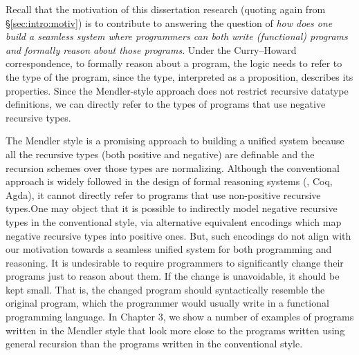 Recall that the motivation of this dissertation research
(quoting again from \S\ref{sec:intro:motiv})
is to contribute to answering the question of {\em how does one build a
seamless system where programmers can both write (functional) programs and
formally reason about those programs}. Under the Curry--Howard correspondence,
to formally reason about a program, the logic needs to refer to the type of
the program, since the type, interpreted as a proposition, describes its
properties. Since the Mendler-style approach does not restrict recursive
datatype definitions, we can directly refer to the types of programs that use
negative recursive types.

The Mendler style is a promising approach to building a unified system because
all the recursive types (both positive and negative) are definable and
the recursion schemes over those types are normalizing.
Although the conventional approach is widely followed
in the design of formal reasoning systems (\eg, Coq, Agda), it cannot directly
refer to programs that use non-positive recursive types.One may object that
it is possible to indirectly model negative recursive types
in the conventional style, via alternative equivalent encodings
which map negative recursive types into positive ones. But, such
encodings do not align with our motivation towards a seamless unified
system for both programming and reasoning. It is undesirable to require
programmers to significantly change their programs just to reason about them.
If the change is unavoidable, it should be kept small. That is,
the changed program should syntactically resemble the original program,
which the programmer would usually write in a functional programming language.
In Chapter 3, we show a number of examples of programs written in
the Mendler style that look more close to the programs written using
general recursion than the programs written in the conventional style.


